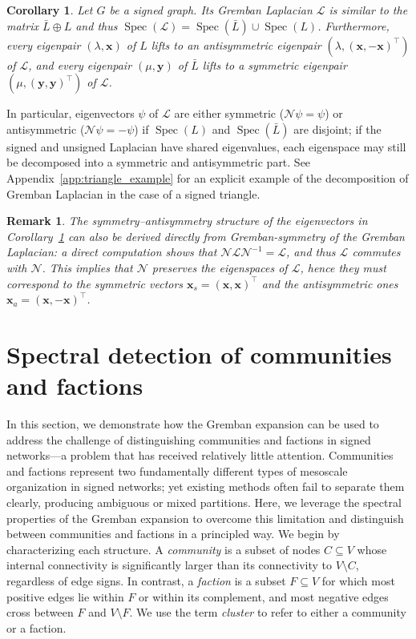 \documentclass[reprint,onecolumn]{article}
\newtheorem{corollary}[theorem]{Corollary}
\newtheorem{remark}[theorem]{Remark}
\newcommand{\mc}[1]{\mathcal{#1}}
\newcommand{\1}{\mathbb{1}}
\newcommand{\0}{\mathbf{0}}
\DeclareMathOperator\spec{Spec}
\begin{document}
\begin{corollary}\label{cor:laplacian_spectrum_expansion}
Let $G$ be a signed graph. Its Gremban Laplacian $\mathcal{L}$ is similar to the matrix $\bar{L}\oplus L$ and thus $\spec(\mathcal{L})=\spec(\bar{L})\cup\spec(L)$. Furthermore, every eigenpair $(\lambda,\mathbf{x})$ of $L$ lifts to an antisymmetric eigenpair $(\lambda,(\mathbf{x},-\mathbf{x})^\top)$ of $\mathcal{L}$, and every eigenpair $(\mu,\mathbf{y})$ of $\bar{L}$ lifts to a symmetric eigenpair $(\mu,(\mathbf{y},\mathbf{y})^\top)$ of $\mathcal{L}$.
\end{corollary}
In particular, eigenvectors $\psi$ of $\mathcal{L}$ are either symmetric ($\mc N \psi=\psi$) or antisymmetric ($\mc N \psi=-\psi$) if $\spec(L)$ and $\spec(\bar{L})$ are disjoint; if the signed and unsigned Laplacian have shared eigenvalues, each eigenspace may still be decomposed into a symmetric and antisymmetric part. See Appendix~\ref{app:triangle_example} for an explicit example of the decomposition of Gremban Laplacian in the case of a signed triangle.

\begin{remark}
\label{rmk:involution_symmetry}
The symmetry--antisymmetry structure of the eigenvectors in Corollary~\ref{cor:laplacian_spectrum_expansion} can also be derived directly from Gremban-symmetry of the Gremban Laplacian: a direct computation shows that \( \mc N \mc L \mc N^{-1} = \mc L \), and thus \( \mc L \) commutes with \( \mc N \). This implies that $\mc N$ preserves the eigenspaces of $\mc L$, hence they must correspond to the symmetric vectors \( \mathbf{x}_s = (\mathbf{x},\mathbf{x})^\top \) and the antisymmetric ones \( \mathbf{x}_a =  (\mathbf{x},-\mathbf{x})^\top \).
\end{remark}
%
\section{Spectral detection of communities and factions}\label{sec:spectral_detection_faction_community}
In this section, we demonstrate how the Gremban expansion can be used to address the challenge of distinguishing communities and factions in signed networks---a problem that has received relatively little attention. Communities and factions represent two fundamentally different types of mesoscale organization in signed networks; yet existing methods often fail to separate them clearly, producing ambiguous or mixed partitions. Here, we leverage the spectral properties of the Gremban expansion to overcome this limitation and distinguish between communities and factions in a principled way. We begin by characterizing each structure.  A \emph{community} is a subset of nodes \( C \subseteq V \) whose internal connectivity is significantly larger than its connectivity to  \( V \setminus C \),  regardless of edge signs. In contrast, a \emph{faction} is a subset \( F \subseteq V \) for which most positive edges lie within $F$ or within its complement, and most negative edges cross between $F$ and $V\setminus F$. We use the term \emph{cluster} to refer to either a community or a faction.
\end{document}
